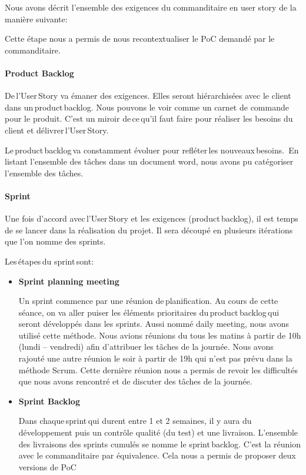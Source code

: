 Nous avons décrit l’ensemble des exigences du commanditaire en user story de la manière suivante:




Cette étape nous a permis de nous recontextualiser le PoC demandé par le commanditaire.

\paragraph{Product Backlog}
De l'User Story va émaner des exigences.
Elles seront hiérarchisées avec le client dans un product backlog.
Nous pouvons le voir comme un carnet de commande pour le produit.
C’est un miroir de ce qu'il faut faire pour réaliser les besoins du client et délivrer l'User Story.

Le product backlog va constamment évoluer pour refléter les nouveaux besoins.  
En listant l'ensemble des tâches dans un document word, nous avons pu catégoriser l’ensemble des tâches. 




\paragraph{Sprint}
Une fois d'accord avec l'User Story et les exigences (product backlog), il est temps de se lancer dans la réalisation du projet.
Il sera découpé en plusieurs itérations que l’on nomme des sprints.  

Les étapes du sprint sont: 
\begin{itemize}
\item \textbf{Sprint planning meeting}

Un sprint commence par une réunion de planification.
Au cours de cette séance, on va aller puiser les éléments prioritaires du product backlog qui seront développés dans les sprints.
Aussi nommé daily meeting, nous avons utilisé cette méthode.
Nous avions réunions du tous les matins à partir de 10h (lundi – vendredi) afin d’attribuer les tâches de la journée.
Nous avons rajouté une autre réunion le soir à partir de 19h qui n’est pas prévu dans la méthode Scrum.
Cette dernière réunion nous a permis de revoir les difficultés que nous avons rencontré et de discuter des tâches de la journée.

\item \textbf{Sprint Backlog}

Dans chaque sprint qui durent entre 1 et 2 semaines, il y aura du développement puis un contrôle qualité (du test) et une livraison.
L'ensemble des livraisons des sprints cumulés se nomme le sprint backlog.
C'est la réunion avec le commanditaire par équivalence.
Cela nous a permis de proposer deux versions de PoC

\end{itemize}

